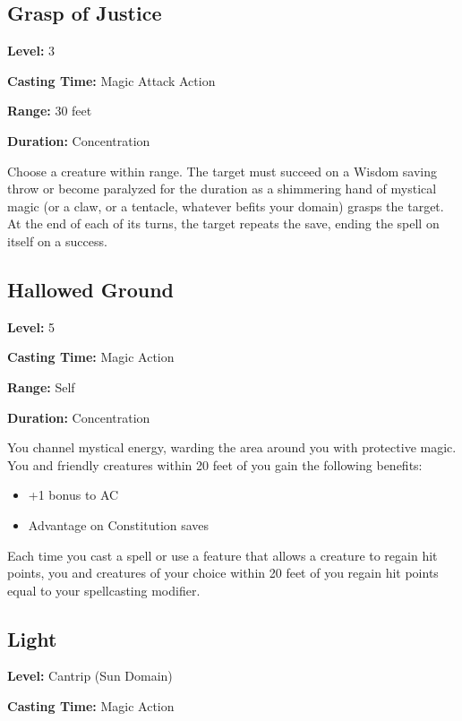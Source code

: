 \documentclass[12pt,letterpaper,twocolumn,openany,nodeprecatedcode,bg=none]{dndbook}
\providecommand{\tightlist}{%
  \setlength{\itemsep}{0pt}\setlength{\parskip}{0pt}}
\begin{document}
\subsection{Grasp of Justice}\label{grasp-of-justice}

\textbf{Level:} 3

\textbf{Casting Time:} Magic Attack Action

\textbf{Range:} 30 feet

\textbf{Duration:} Concentration

Choose a creature within range. The target must succeed on a Wisdom
saving throw or become paralyzed for the duration as a shimmering hand
of mystical magic (or a claw, or a tentacle, whatever befits your
domain) grasps the target. At the end of each of its turns, the target
repeats the save, ending the spell on itself on a success.

\clearpage

\subsection{Hallowed Ground}\label{hallowed-ground}

\textbf{Level:} 5

\textbf{Casting Time:} Magic Action

\textbf{Range:} Self

\textbf{Duration:} Concentration

You channel mystical energy, warding the area around you with protective
magic. You and friendly creatures within 20 feet of you gain the
following benefits:

\begin{itemize}
\tightlist
\item
  +1 bonus to AC
\item
  Advantage on Constitution saves
\end{itemize}

Each time you cast a spell or use a feature that allows a creature to
regain hit points, you and creatures of your choice within 20 feet of
you regain hit points equal to your spellcasting modifier.

\subsection{Light}\label{light}

\textbf{Level:} Cantrip (Sun Domain)

\textbf{Casting Time:} Magic Action
\end{document}
